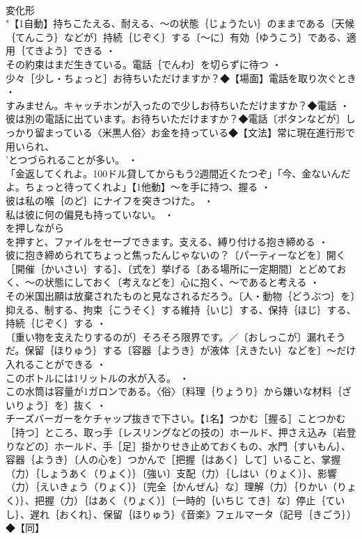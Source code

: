 \documentclass[8pt]{extreport}
\begin{document}
\begin{CJK}{UTF8}{min}
\\	変化形 
\\	"【1自動】持ちこたえる、耐える、～の状態｛じょうたい｝のままである〔天候｛てんこう｝などが〕持続｛じぞく｝する〔～に〕有効｛ゆうこう｝である、適用｛てきよう｝できる ・
\\	その約束はまだ生きている。電話｛でんわ｝を切らずに待つ ・
\\	少々［少し・ちょっと］お待ちいただけますか？◆【場面】電話を取り次ぐとき ・
\\	すみません。キャッチホンが入ったので少しお待ちいただけますか？◆電話 ・
\\	彼は別の電話に出ています。お待ちいただけますか？◆電話〔ボタンなどが〕しっかり留まっている〈米黒人俗〉お金を持っている◆【文法】常に現在進行形で用いられ、
\\	'とつづられることが多い。 ・
\\	「金返してくれよ。100ドル貸してからもう2週間近くたつぞ」「今、金ないんだよ。ちょっと待ってくれよ」【1他動】～を手に持つ、握る ・
\\	彼は私の喉｛のど｝にナイフを突きつけた。 ・
\\	私は彼に何の偏見も持っていない。 ・
\\	を押しながら
\\	を押すと、ファイルをセーブできます。支える、縛り付ける抱き締める ・
\\	彼に抱き締められてちょっと焦ったんじゃないの？〔パーティーなどを〕開く［開催｛かいさい｝する］、〔式を〕挙げる〔ある場所に一定期間〕とどめておく、～の状態にしておく〔考えなどを〕心に抱く、～であると考える ・
\\	その米国出願は放棄されたものと見なされるだろう。〔人・動物｛どうぶつ｝を〕抑える、制する、拘束｛こうそく｝する維持｛いじ｝する、保持｛ほじ｝する、持続｛じぞく｝する ・
\\	〔重い物を支えたりするのが〕そろそろ限界です。／〔おしっこが〕漏れそうだ。保留｛ほりゅう｝する〔容器｛ようき｝が液体｛えきたい｝などを〕～だけ入れることができる ・
\\	このボトルには1リットルの水が入る。 ・
\\	この水筒は容量が1ガロンである。〈俗〉〔料理｛りょうり｝から嫌いな材料｛ざいりょう｝を〕抜く ・
\\	チーズバーガーをケチャップ抜きで下さい。【1名】つかむ［握る］ことつかむ［持つ］ところ、取っ手〔レスリングなどの技の〕ホールド、押さえ込み〔岩登りなどの〕ホールド、手［足］掛かりせき止めておくもの、水門｛すいもん｝、容器｛ようき｝〔人の心を〕つかんで［把握｛はあく｝して］いること、掌握（力）｛しょうあく（りょく）｝〔強い〕支配（力）｛しはい（りょく）｝、影響（力）｛えいきょう（りょく）｝〔完全｛かんぜん｝な〕理解（力）｛りかい（りょく）｝、把握（力）｛はあく（りょく）｝〔一時的｛いちじ てき｝な〕停止｛ていし｝、遅れ｛おくれ｝、保留｛ほりゅう｝《音楽》フェルマータ（記号｛きごう｝）◆【同】

\end{CJK}
\end{document}
